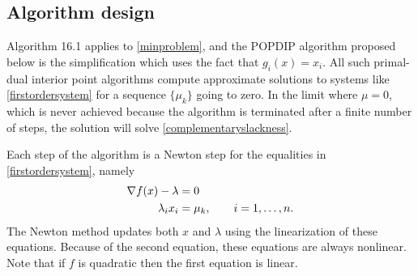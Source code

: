 \documentclass[11pt]{article}
\newcommand{\grad}{\nabla}
\begin{document}
\subsection*{Algorithm design}

Algorithm 16.1 \cite{GrivaNashSofer2009} applies to \eqref{minproblem}, and the POPDIP algorithm proposed below is the simplification which uses the fact that $g_i(x)=x_i$.  All such primal-dual interior point algorithms compute approximate solutions to systems like \eqref{firstordersystem} for a sequence $\{\mu_k\}$ going to zero.  In the limit where $\mu=0$, which is never achieved because the algorithm is terminated after a finite number of steps, the solution will solve \eqref{complementaryslackness}.

Each step of the algorithm is a Newton step for the equalities in \eqref{firstordersystem}, namely
\begin{align}
\grad f(x) - \lambda &= 0 \label{equalitysystem} \\
\lambda_i x_i &= \mu_k, \qquad i=1,\dots,n. \notag
\end{align}
The Newton method updates both $x$ and $\lambda$ using the linearization of these equations.  Because of the second equation, these equations are always nonlinear.  Note that if $f$ is quadratic then the first equation is linear.
\end{document}
